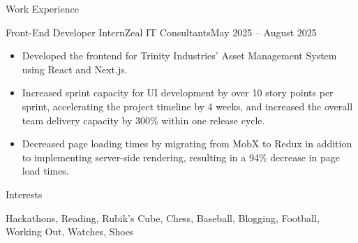\documentclass[]{mcdowellcv}
\begin{document}
		\begin{cvsection}{Work Experience}
		\begin{cvsubsection}{Front-End Developer Intern}{Zeal IT Consultants}{May 2025 -- August 2025}			
			\begin{itemize}
				\item Developed the frontend for Trinity Industries' Asset Management System using React and Next.js.
				\smallskip
				\item Increased sprint capacity for UI development by over 10 story points per sprint, accelerating the project timeline by 4 weeks, and increased the overall team delivery capacity by 300\% within one release cycle.
				\smallskip
				\item Decreased page loading times by migrating from MobX to Redux in addition to implementing server-side rendering, resulting in a 94\% decrease in page load times.
			\end{itemize}
		\end{cvsubsection}
	\end{cvsection}

	\begin{cvsection}{Interests}
		\begin{cvsubsection}{}{}{}
			\medskip
				Hackathons, Reading, Rubik's Cube, Chess, Baseball, Blogging, Football, Working Out, Watches, Shoes
		\end{cvsubsection}
	\end{cvsection}

	
\end{document}
